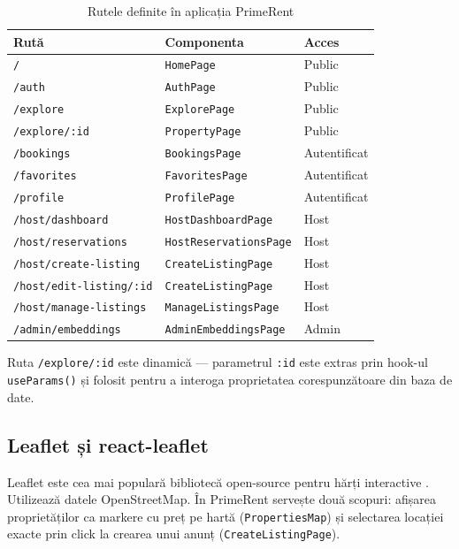 \documentclass[12pt,a4paper,oneside]{report}
\begin{document}
\begin{table}[H]
\centering
\caption{Rutele definite în aplicația PrimeRent}
\small
\begin{tabular}{l l l}
\toprule
\textbf{Rută} & \textbf{Componenta} & \textbf{Acces} \\
\midrule
\texttt{/}                    & \texttt{HomePage}           & Public \\
\texttt{/auth}                & \texttt{AuthPage}            & Public \\
\texttt{/explore}             & \texttt{ExplorePage}         & Public \\
\texttt{/explore/:id}         & \texttt{PropertyPage}        & Public \\
\texttt{/bookings}            & \texttt{BookingsPage}        & Autentificat \\
\texttt{/favorites}           & \texttt{FavoritesPage}       & Autentificat \\
\texttt{/profile}             & \texttt{ProfilePage}         & Autentificat \\
\texttt{/host/dashboard}      & \texttt{HostDashboardPage}   & Host \\
\texttt{/host/reservations}   & \texttt{HostReservationsPage} & Host \\
\texttt{/host/create-listing} & \texttt{CreateListingPage}   & Host \\
\texttt{/host/edit-listing/:id} & \texttt{CreateListingPage}  & Host \\
\texttt{/host/manage-listings} & \texttt{ManageListingsPage} & Host \\
\texttt{/admin/embeddings}    & \texttt{AdminEmbeddingsPage} & Admin \\
\bottomrule
\end{tabular}
\end{table}

Ruta \texttt{/explore/:id} este dinamică — parametrul \texttt{:id} este extras prin hook-ul \texttt{useParams()} și folosit pentru a interoga proprietatea corespunzătoare din baza de date.

\subsection{Leaflet și react-leaflet}

Leaflet este cea mai populară bibliotecă open-source pentru hărți interactive \cite{leaflet}. Utilizează datele OpenStreetMap. În PrimeRent servește două scopuri: afișarea proprietăților ca markere cu preț pe hartă (\texttt{PropertiesMap}) și selectarea locației exacte prin click la crearea unui anunț (\texttt{CreateListingPage}).
\end{document}
